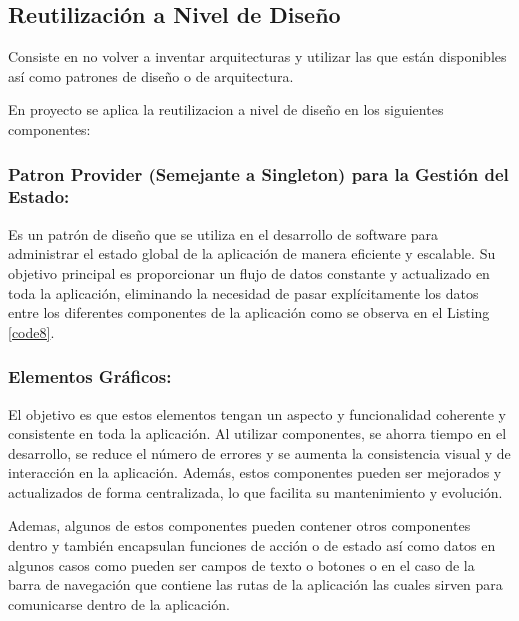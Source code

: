 \documentclass[runningheads]{llncs}
\begin{document}
\subsection*{Reutilización a Nivel de Diseño}
Consiste en no volver a inventar arquitecturas y utilizar las que están disponibles así como patrones de diseño o de arquitectura.

En proyecto se aplica la reutilizacion a nivel de diseño en los siguientes componentes:

\subsubsection*{Patron Provider (Semejante a Singleton) para la Gestión del Estado:}
Es un patrón de diseño que se utiliza en el desarrollo de software para administrar el estado global de la aplicación de manera eficiente y escalable. Su objetivo principal es proporcionar un flujo de datos constante y actualizado en toda la aplicación, eliminando la necesidad de pasar explícitamente los datos entre los diferentes componentes de la aplicación como se observa en el Listing \ref{code8}. 


\subsubsection*{Elementos Gráficos: }
El objetivo es que estos elementos tengan un aspecto y funcionalidad coherente y consistente en toda la aplicación. Al utilizar componentes, se ahorra tiempo en el desarrollo, se reduce el número de errores y se aumenta la consistencia visual y de interacción en la aplicación. Además, estos componentes pueden ser mejorados y actualizados de forma centralizada, lo que facilita su mantenimiento y evolución.

Ademas, algunos de estos componentes pueden contener otros componentes dentro y también encapsulan funciones de acción o de estado así como datos en algunos casos como pueden ser campos de texto o botones o en el caso de la barra de navegación que contiene las rutas de la aplicación las cuales sirven para comunicarse dentro de la aplicación.
\end{document}
